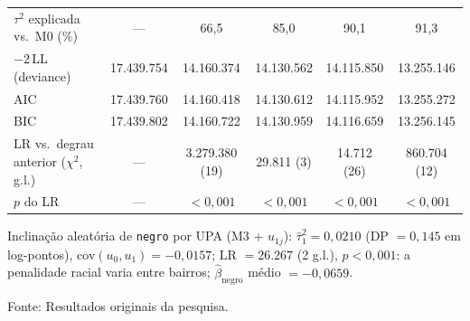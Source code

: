 \documentclass[11pt, a4paper, oneside]{article}
\begin{document}
\begin{table}[htbp]
{\begin{tabular}{lccccc}
$\tau^2$ explicada vs.\ M0 (\%) & --- & 66,5 & 85,0 & 90,1 & 91,3 \\
$-2\,$LL (deviance) & 17.439.754 & 14.160.374 & 14.130.562 & 14.115.850 & 13.255.146 \\
AIC & 17.439.760 & 14.160.418 & 14.130.612 & 14.115.952 & 13.255.272 \\
BIC & 17.439.802 & 14.160.722 & 14.130.959 & 14.116.659 & 13.256.145 \\
LR vs.\ degrau anterior ($\chi^2$, g.l.) & --- & 3.279.380 (19) & 29.811 (3) & 14.712 (26) & 860.704 (12) \\
$p$ do LR & --- & $<0{,}001$ & $<0{,}001$ & $<0{,}001$ & $<0{,}001$ \\
\bottomrule
\end{tabular}}

\noindent\footnotesize{Inclinação aleatória de \texttt{negro} por UPA (M3 + $u_{1j}$):} $\hat\tau^2_{1} = 0,0210$ (DP $= 0,145$ em log-pontos), cov$(u_0,u_1) = −0,0157$; LR $= 26.267$ (2 g.l.), $p<0{,}001$: a penalidade racial varia entre bairros; $\hat\beta_{\text{negro}}$ médio $= −0,0659$.
\normalsize
\par\smallskip\footnotesize Fonte: Resultados originais da pesquisa.
\end{table}
\end{document}
